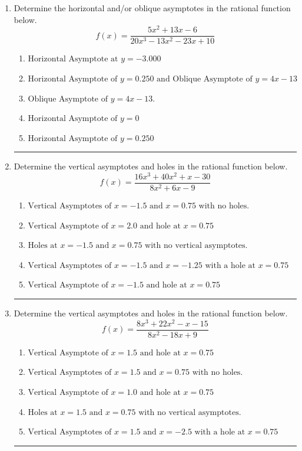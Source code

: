 \documentclass[14pt]{extbook}
\newcommand{\litem}[1]{\item#1\hspace*{-1cm}\rule{\textwidth}{0.4pt}}
\begin{document}
\begin{enumerate}
\litem{
Determine the horizontal and/or oblique asymptotes in the rational function below.\[ f(x) = \frac{5x^{2} +13 x -6}{20x^{3} -13 x^{2} -23 x + 10} \]\begin{enumerate}[label=\Alph*.]
\item \( \text{Horizontal Asymptote at } y = -3.000 \)
\item \( \text{Horizontal Asymptote of } y = 0.250 \text{ and Oblique Asymptote of } y = 4x -13 \)
\item \( \text{Oblique Asymptote of } y = 4x -13. \)
\item \( \text{Horizontal Asymptote of } y = 0 \)
\item \( \text{Horizontal Asymptote of } y = 0.250  \)

\end{enumerate} }
\litem{
Determine the vertical asymptotes and holes in the rational function below.\[ f(x) = \frac{16x^{3} +40 x^{2} +x -30}{8x^{2} +6 x -9} \]\begin{enumerate}[label=\Alph*.]
\item \( \text{Vertical Asymptotes of } x = -1.5 \text{ and } x = 0.75 \text{ with no holes.} \)
\item \( \text{Vertical Asymptote of } x = 2.0 \text{ and hole at } x = 0.75 \)
\item \( \text{Holes at } x = -1.5 \text{ and } x = 0.75 \text{ with no vertical asymptotes.} \)
\item \( \text{Vertical Asymptotes of } x = -1.5 \text{ and } x = -1.25 \text{ with a hole at } x = 0.75 \)
\item \( \text{Vertical Asymptote of } x = -1.5 \text{ and hole at } x = 0.75 \)

\end{enumerate} }
\litem{
Determine the vertical asymptotes and holes in the rational function below.\[ f(x) = \frac{8x^{3} +22 x^{2} -x -15}{8x^{2} -18 x + 9} \]\begin{enumerate}[label=\Alph*.]
\item \( \text{Vertical Asymptote of } x = 1.5 \text{ and hole at } x = 0.75 \)
\item \( \text{Vertical Asymptotes of } x = 1.5 \text{ and } x = 0.75 \text{ with no holes.} \)
\item \( \text{Vertical Asymptote of } x = 1.0 \text{ and hole at } x = 0.75 \)
\item \( \text{Holes at } x = 1.5 \text{ and } x = 0.75 \text{ with no vertical asymptotes.} \)
\item \( \text{Vertical Asymptotes of } x = 1.5 \text{ and } x = -2.5 \text{ with a hole at } x = 0.75 \)


\end{enumerate}}
\end{enumerate}
\end{document}
